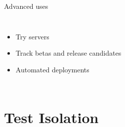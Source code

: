 \documentclass[xcolor=svgnames,17pt]{beamer}
\begin{document}
\begin{frame}{Advanced uses}

\begin{columns}
\begin{itemize}
\item Try servers
\item Track betas and release candidates
\item Automated deployments
\end{itemize}
\end{columns}

\end{frame}

\section{Test Isolation}

\begin{frame}{}
\tableofcontents[currentsection]
\end{frame}
\end{document}
